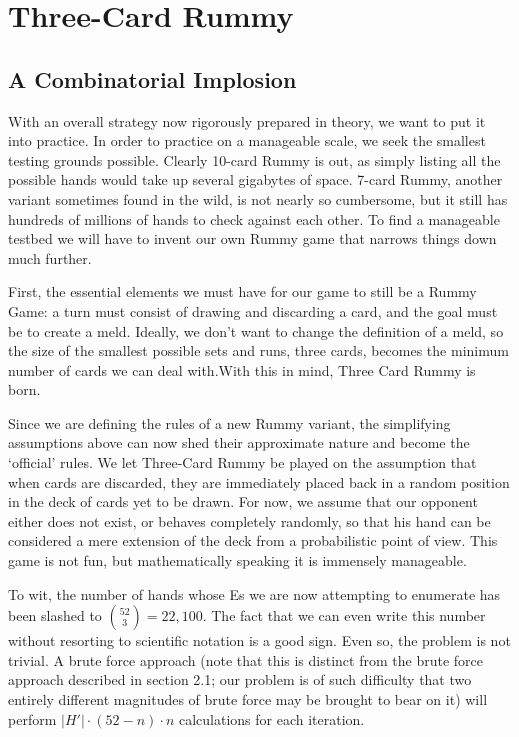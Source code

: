 \documentclass[paper=a4, fontsize=11pt,twoside]{report}   %
\begin{document}
\chapter{Three-Card Rummy}

\section{A Combinatorial Implosion}

With an overall strategy now rigorously prepared in theory, we want to put it into practice. In order to practice on a manageable scale, we seek the smallest testing grounds possible. Clearly 10-card Rummy is out, as simply listing all the possible hands would take up several gigabytes of space. 7-card Rummy, another variant sometimes found in the wild, is not nearly so cumbersome, but it still has hundreds of millions of hands to check against each other. To find a manageable testbed we will have to invent our own Rummy game that narrows things down much further.

First, the essential elements we must have for our game to still be a Rummy Game: a turn must consist of drawing and discarding a card, and the goal must be to create a meld. Ideally, we don’t want to change the definition of a meld, so the size of the smallest possible sets and runs, three cards, becomes the minimum number of cards we can deal with.With this in mind, Three Card Rummy is born. 

Since we are defining the rules of a new Rummy variant, the simplifying assumptions above can now shed their approximate nature and become the ‘official’ rules. We let Three-Card Rummy be played on the assumption that when cards are discarded, they are immediately placed back in a random position in the deck of cards yet to be drawn. For now, we assume that our opponent either does not exist, or behaves completely randomly, so that his hand can be considered a mere extension of the deck from a probabilistic point of view. This game is not fun, but mathematically speaking it is immensely manageable. 

To wit, the number of hands whose Es we are now attempting to enumerate has been slashed to $\binom{52}{3} = 22,100$. The fact that we can even write this number without resorting to scientific notation is a good sign. Even so, the problem is not trivial. A brute force approach (note that this is distinct from the brute force approach described in section 2.1; our problem is of such difficulty that two entirely different magnitudes of brute force may be brought to bear on it) will perform $|H′| \cdot(52−n ) \cdot n$ calculations for each iteration.
\end{document}
